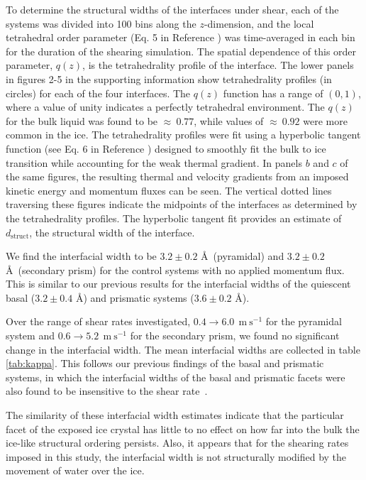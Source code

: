 To determine the structural widths of the interfaces under shear, each
of the systems was divided into 100 bins along the $z$-dimension, and
the local tetrahedral order parameter (Eq. 5 in Reference
\citealp{Louden13}) was time-averaged in each bin for the duration of
the shearing simulation.  The spatial dependence of this order
parameter, $q(z)$, is the tetrahedrality profile of the interface.
The lower panels in figures 2-5 in the supporting information show
tetrahedrality profiles (in circles) for each of the four interfaces.
The $q(z)$ function has a range of $(0,1)$, where a value of unity
indicates a perfectly tetrahedral environment.  The $q(z)$ for the
bulk liquid was found to be $\approx~0.77$, while values of
$\approx~0.92$ were more common in the ice. The tetrahedrality
profiles were fit using a hyperbolic tangent function (see Eq. 6 in
Reference \citealp{Louden13}) designed to smoothly fit the bulk to ice
transition while accounting for the weak thermal gradient. In panels
$b$ and $c$ of the same figures, the resulting thermal and velocity
gradients from an imposed kinetic energy and momentum fluxes can be
seen. The vertical dotted lines traversing these figures indicate the
midpoints of the interfaces as determined by the tetrahedrality
profiles.  The hyperbolic tangent fit provides an estimate of
$d_\mathrm{struct}$, the structural width of the interface.
 
We find the interfacial width to be $3.2 \pm 0.2$ \AA\ (pyramidal) and
$3.2 \pm 0.2$ \AA\ (secondary prism) for the control systems with no
applied momentum flux. This is similar to our previous results for the
interfacial widths of the quiescent basal ($3.2 \pm 0.4$ \AA) and
prismatic systems ($3.6 \pm 0.2$ \AA).

Over the range of shear rates investigated, $0.4 \rightarrow
6.0~\mathrm{~m~s}^{-1}$ for the pyramidal system and $0.6 \rightarrow
5.2~\mathrm{~m~s}^{-1}$ for the secondary prism, we found no
significant change in the interfacial width. The mean interfacial
widths are collected in table \ref{tab:kappa}. This follows our
previous findings of the basal and prismatic systems, in which the
interfacial widths of the basal and prismatic facets were also found
to be insensitive to the shear rate~\cite{Louden13}.

The similarity of these interfacial width estimates indicate that the
particular facet of the exposed ice crystal has little to no effect on
how far into the bulk the ice-like structural ordering persists. Also,
it appears that for the shearing rates imposed in this study, the
interfacial width is not structurally modified by the movement of
water over the ice.

